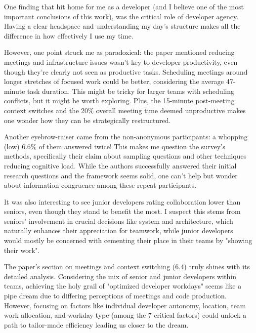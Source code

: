 \documentclass{article}
\begin{document}
One finding that hit home for me as a developer (and I believe one of the most important conclusions of this work), was the critical role of developer agency. Having a clear headspace and understanding my day's structure makes all the difference in how effectively I use my time.

However, one point struck me as paradoxical: the paper mentioned reducing meetings and infrastructure issues wasn't key to developer productivity, even though they're clearly not seen as productive tasks. Scheduling meetings around longer stretches of focused work could be better, considering the average 47-minute task duration. This might be tricky for larger teams with scheduling conflicts, but it might be worth exploring. Plus, the 15-minute post-meeting context switches and the 20\% overall meeting time deemed unproductive makes one wonder how they can be strategically restructured.

Another eyebrow-raiser came from the non-anonymous participants: a whopping (low) 6.6\% of them answered twice! This makes me question the survey's methods, specifically their claim about sampling questions and other techniques reducing cognitive load. While the authors successfully answered their initial research questions and the framework seems solid, one can't help but wonder about information congruence among these repeat participants.

It was also interesting to see junior developers rating collaboration lower than seniors, even though they stand to benefit the most. I suspect this stems from seniors' involvement in crucial decisions like system and architecture, which naturally enhances their appreciation for teamwork, while junior developers would mostly be concerned with cementing their place in their teams by "showing their work".

The paper's section on meetings and context switching (6.4) truly shines with its detailed analysis. Considering the mix of senior and junior developers within teams, achieving the holy grail of "optimized developer workdays" seems like a pipe dream due to differing perceptions of meetings and code production. However, focusing on factors like individual developer autonomy, location, team work allocation, and workday type (among the 7 critical factors) could unlock a path to tailor-made efficiency leading us closer to the dream.
\end{document}
